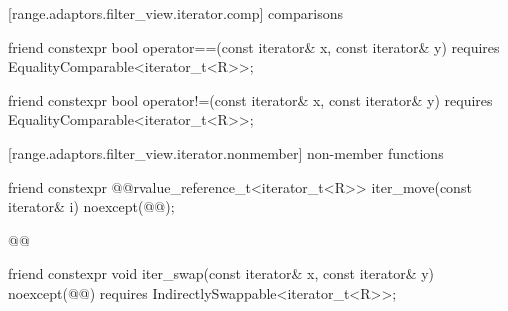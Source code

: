 [range.adaptors.filter_view.iterator.comp]{ comparisons}

%
\begin{itemdecl}
friend constexpr bool operator==(const iterator& x, const iterator& y)
  requires EqualityComparable<iterator_t<R>>;
\end{itemdecl}

\begin{itemdescr}
\pnum
\oldtxt{\returns} 
\end{itemdescr}

%
\begin{itemdecl}
friend constexpr bool operator!=(const iterator& x, const iterator& y)
  requires EqualityComparable<iterator_t<R>>;
\end{itemdecl}

\begin{itemdescr}
\pnum
\oldtxt{\returns} 
\end{itemdescr}

[range.adaptors.filter_view.iterator.nonmember]{ non-member functions}

%
\begin{itemdecl}
friend constexpr @@rvalue_reference_t<iterator_t<R>> iter_move(const iterator& i)
  noexcept(@\oldtxt{\seebelow}@);
\end{itemdecl}

\begin{itemdescr}
\pnum
\oldtxt{\returns} 

\pnum
{}
\begin{codeblock}
@@
\end{codeblock}
\end{itemdescr}

%
\begin{itemdecl}
friend constexpr void iter_swap(const iterator& x, const iterator& y)
  noexcept(@\oldtxt{\seebelow}@)
  requires IndirectlySwappable<iterator_t<R>>;
\end{itemdecl}

